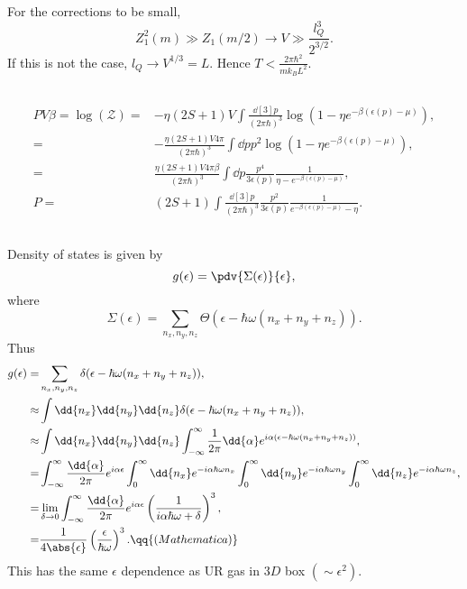 \documentclass[a4paper,12pt,twoside]{article}
\begin{document}
\begin{multicols*}{2}
\subsubsection{}
For the corrections to be small,
\begin{equation}
	Z_1^2(m) \gg Z_1(m/2) \rightarrow V \gg \frac{l_Q^3}{2^{3/2}}.
\end{equation}
If this is not the case, $l_Q \rightarrow V^{1/3} = L$.
Hence $T < \frac{2\pi \hbar^2}{m k_B L^2}$.

\subsection{}
\begin{align}
	PV\beta = \log(\mathscr{Z}) =& -\eta(2S+1)V\int\frac{\dd[3]{p}}{(2\pi\hbar)^3}\log(1-\eta e^{-\beta(\epsilon(p) - \mu)}),\\
	=& -\frac{\eta(2S+1)V 4\pi}{(2\pi\hbar)^3} \int \dd{p} p^2 \log(1-\eta e^{-\beta(\epsilon(p)-\mu)}),\\
	=& \frac{\eta (2S+1)V 4\pi \beta}{(2\pi\hbar)^3} \int \dd{p}\frac{p^4}{3\epsilon(p)} \frac{1}{\eta - e^{-\beta(\epsilon(p)-\mu)}},\\
	P =& (2S+1) \int \frac{\dd[3]{p}}{(2\pi\hbar)^3}\frac{p^2}{3\epsilon(p)} \frac{1}{e^{-\beta(\epsilon(p)-\mu)}-\eta}.
\end{align}
\subsection{}
Density of states is given by
\begin{equation}
	g(\epsilon) = \pdv{\Sigma(\epsilon)}{\epsilon},
\end{equation}
where
\begin{equation}
	\Sigma(\epsilon) = \sum_{n_x,n_y,n_z} \Theta(\epsilon - \hbar\omega(n_x+n_y+n_z)).
\end{equation}
Thus
\begin{align}
	g(\epsilon) =& \sum_{n_x,n_y,n_z} \delta(\epsilon - \hbar\omega(n_x+n_y+n_z)),\\
	\approx& \int \dd{n_x}\dd{n_y}\dd{n_z} \delta(\epsilon - \hbar\omega(n_x+n_y+n_z)),\\
	\approx& \int \dd{n_x}\dd{n_y}\dd{n_z} \int_{-\infty}^\infty \frac{1}{2\pi}\dd{\alpha} e^{i\alpha(\epsilon - \hbar\omega(n_x+n_y+n_z))},\\
	=& \int_{-\infty}^\infty {
	\frac{\dd{\alpha}}{2\pi} e^{i\alpha \epsilon} \int_0^\infty \dd{n_x} e^{-i\alpha \hbar\omega n_x}
	\int_0^\infty \dd{n_y} e^{-i\alpha \hbar\omega n_y}
	\int_0^\infty \dd{n_z} e^{-i\alpha \hbar\omega n_z}
	},\\
	=& \lim_{\delta \rightarrow 0}\int_{-\infty}^\infty \frac{\dd{\alpha}}{2\pi} e^{i\alpha \epsilon} \left(\frac{1}{i\alpha\hbar\omega+\delta}\right)^3,\\
	=& \frac{1}{4\abs{\epsilon}}\left(\frac{\epsilon}{\hbar\omega}\right)^3. \qq{(Mathematica)}
\end{align}
This has the same $\epsilon$ dependence as UR gas in $3D$ box $(\sim\epsilon^2)$.


\end{multicols*}
\end{document}
